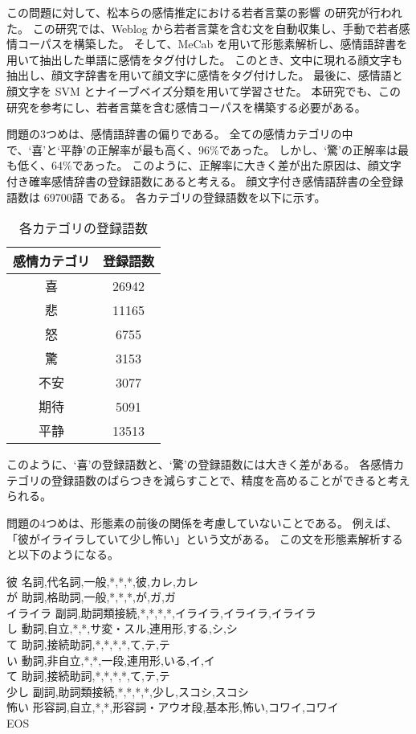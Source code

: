 \documentclass[11pt,a4j]{jsarticle}
\begin{document}
この問題に対して、松本らの感情推定における若者言葉の影響  の研究が行われた。
この研究では、Weblog から若者言葉を含む文を自動収集し、手動で若者感情コーパスを構築した。
そして、MeCab を用いて形態素解析し、感情語辞書を用いて抽出した単語に感情をタグ付けした。
このとき、文中に現れる顔文字も抽出し、顔文字辞書を用いて顔文字に感情をタグ付けした。
最後に、感情語と顔文字を SVM とナイーブベイズ分類を用いて学習させた。
本研究でも、この研究を参考にし、若者言葉を含む感情コーパスを構築する必要がある。

問題の3つめは、感情語辞書の偏りである。
全ての感情カテゴリの中で、`喜'と`平静'の正解率が最も高く、96\%であった。
しかし、`驚'の正解率は最も低く、64\%であった。
このように、正解率に大きく差が出た原因は、顔文字付き確率感情辞書の登録語数にあると考える。
顔文字付き感情語辞書の全登録語数は 69700語 である。
各カテゴリの登録語数を以下に示す。

\begin{table}[ht]
  \caption{各カテゴリの登録語数}
\centering
\begin{tabular}{c|c} \hline
  感情カテゴリ & 登録語数 \\ \hline \hline
  喜 & 26942 \\ \hline
  悲 & 11165 \\ \hline
  怒 & 6755 \\ \hline
  驚 & 3153 \\ \hline
  不安 & 3077 \\ \hline
  期待 & 5091 \\ \hline
  平静 & 13513 \\ \hline
\end{tabular}
\end{table}

このように、`喜'の登録語数と、`驚'の登録語数には大きく差がある。
各感情カテゴリの登録語数のばらつきを減らすことで、精度を高めることができると考えられる。

問題の4つめは、形態素の前後の関係を考慮していないことである。
例えば、「彼がイライラしていて少し怖い」という文がある。
この文を形態素解析すると以下のようになる。

\begin{itembox}[l]
  彼  名詞,代名詞,一般,*,*,*,彼,カレ,カレ\\
  が  助詞,格助詞,一般,*,*,*,が,ガ,ガ\\
  イライラ  副詞,助詞類接続,*,*,*,*,イライラ,イライラ,イライラ\\
  し  動詞,自立,*,*,サ変・スル,連用形,する,シ,シ\\
  て  助詞,接続助詞,*,*,*,*,て,テ,テ\\
  い  動詞,非自立,*,*,一段,連用形,いる,イ,イ\\
  て  助詞,接続助詞,*,*,*,*,て,テ,テ\\
  少し  副詞,助詞類接続,*,*,*,*,少し,スコシ,スコシ\\
  怖い  形容詞,自立,*,*,形容詞・アウオ段,基本形,怖い,コワイ,コワイ\\
  EOS
\end{itembox}
\end{document}
